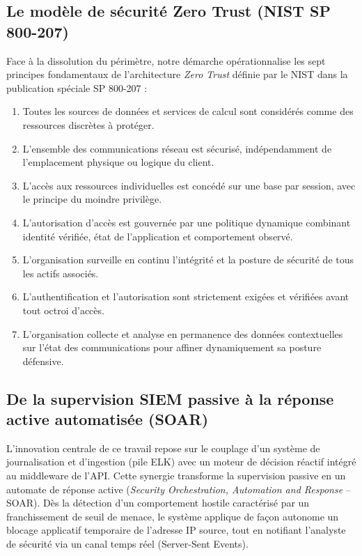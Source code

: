 \subsection{Le modèle de sécurité Zero Trust (NIST SP 800-207)}
Face à la dissolution du périmètre, notre démarche opérationnalise les sept principes fondamentaux de l'architecture \textit{Zero Trust} définie par le NIST dans la publication spéciale SP 800-207 \cite{nist_zt} :
\begin{enumerate}[leftmargin=*]
    \item Toutes les sources de données et services de calcul sont considérés comme des ressources discrètes à protéger.
    \item L'ensemble des communications réseau est sécurisé, indépendamment de l'emplacement physique ou logique du client.
    \item L'accès aux ressources individuelles est concédé sur une base par session, avec le principe du moindre privilège.
    \item L'autorisation d'accès est gouvernée par une politique dynamique combinant identité vérifiée, état de l'application et comportement observé.
    \item L'organisation surveille en continu l'intégrité et la posture de sécurité de tous les actifs associés.
    \item L'authentification et l'autorisation sont strictement exigées et vérifiées avant tout octroi d'accès.
    \item L'organisation collecte et analyse en permanence des données contextuelles sur l'état des communications pour affiner dynamiquement sa posture défensive.
\end{enumerate}

\subsection{De la supervision SIEM passive à la réponse active automatisée (SOAR)}
L'innovation centrale de ce travail repose sur le couplage d'un système de journalisation et d'ingestion (pile ELK) avec un moteur de décision réactif intégré au middleware de l'API. Cette synergie transforme la supervision passive en un automate de réponse active (\textit{Security Orchestration, Automation and Response} -- SOAR). Dès la détection d'un comportement hostile caractérisé par un franchissement de seuil de menace, le système applique de façon autonome un blocage applicatif temporaire de l'adresse IP source, tout en notifiant l'analyste de sécurité via un canal temps réel (Server-Sent Events).

